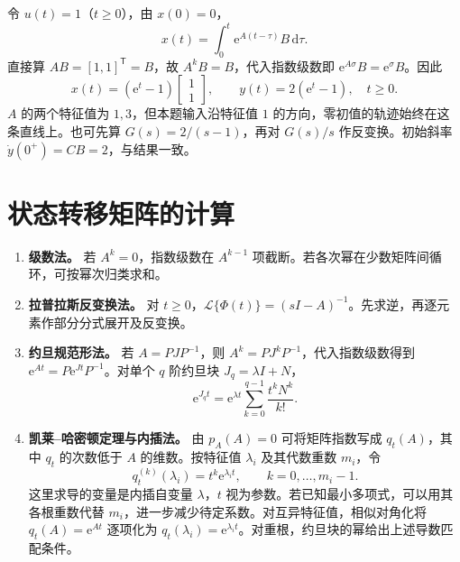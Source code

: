 

\sol 令 $u(t)=1$（$t\ge0$），由 $x(0)=0$，
\[
x(t)=\int_0^t \mathrm e^{A(t-\tau)}B\,\mathrm d\tau .
\]
直接算 $AB=[1,1]^{\mathsf T}=B$，故 $A^kB=B$，代入指数级数即 $\mathrm e^{A\sigma}B=\mathrm e^\sigma B$。因此
\[
x(t)=(\mathrm e^t-1)\begin{bmatrix}1\\1\end{bmatrix},\qquad
\boxed{y(t)=2(\mathrm e^t-1)},\quad t\ge0.
\]
$A$ 的两个特征值为 $1,3$，但本题输入沿特征值 $1$ 的方向，零初值的轨迹始终在这条直线上。也可先算 $G(s)=2/(s-1)$，再对 $G(s)/s$ 作反变换。初始斜率 $\dot y(0^+)=CB=2$，与结果一致。



\section{状态转移矩阵的计算}

\begin{enumerate}
    \item \textbf{级数法。} 若 $A^k=0$，指数级数在 $A^{k-1}$ 项截断。若各次幂在少数矩阵间循环，可按幂次归类求和。
    \item \textbf{拉普拉斯反变换法。} 对 $t\ge 0$，$\mathcal L\{\Phi(t)\}=(sI-A)^{-1}$。先求逆，再逐元素作部分分式展开及反变换。
    \item \textbf{约旦规范形法。} 若 $A=PJP^{-1}$，则 $A^k=PJ^kP^{-1}$，代入指数级数得到 $\mathrm e^{At}=P\mathrm e^{Jt}P^{-1}$。对单个 $q$ 阶约旦块 $J_q=\lambda I+N$，
    \[
    \mathrm e^{J_qt}=\mathrm e^{\lambda t}
    \sum_{k=0}^{q-1}\frac{t^kN^k}{k!}.
    \]
    \item \textbf{凯莱--哈密顿定理与内插法。} 由 $p_A(A)=0$ 可将矩阵指数写成 $q_t(A)$，其中 $q_t$ 的次数低于 $A$ 的维数。按特征值 $\lambda_i$ 及其代数重数 $m_i$，令
    \[
    q_t^{(k)}(\lambda_i)=t^k\mathrm e^{\lambda_i t},
    \qquad k=0,\ldots,m_i-1 .
    \]
    这里求导的变量是内插自变量 $\lambda$，$t$ 视为参数。若已知最小多项式，可以用其各根重数代替 $m_i$，进一步减少待定系数。对互异特征值，相似对角化将 $q_t(A)=\mathrm e^{At}$ 逐项化为 $q_t(\lambda_i)=\mathrm e^{\lambda_i t}$。对重根，约旦块的幂给出上述导数匹配条件。
\end{enumerate}


